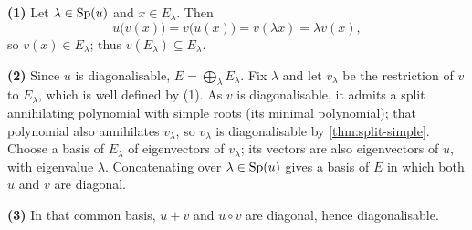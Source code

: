 \begin{solution}{}
\textbf{(1)} Let $\lambda\in\operatorname{Sp}(u)$ and $x\in E_\lambda$. Then
\[
  u\bigl(v(x)\bigr)=v\bigl(u(x)\bigr)=v(\lambda x)=\lambda v(x),
\]
so $v(x)\in E_\lambda$; thus $v(E_\lambda)\subseteq E_\lambda$.

\textbf{(2)} Since $u$ is diagonalisable, $E=\bigoplus_{\lambda}E_\lambda$. Fix
$\lambda$ and let $v_\lambda$ be the restriction of $v$ to $E_\lambda$, which is
well defined by (1). As $v$ is diagonalisable, it admits a split annihilating
polynomial with simple roots (its minimal polynomial); that polynomial also
annihilates $v_\lambda$, so $v_\lambda$ is diagonalisable by
\cref{thm:split-simple}. Choose a basis of $E_\lambda$ of eigenvectors of
$v_\lambda$; its vectors are also eigenvectors of $u$, with eigenvalue
$\lambda$. Concatenating over $\lambda\in\operatorname{Sp}(u)$ gives a basis of $E$ in which
both $u$ and $v$ are diagonal.

\textbf{(3)} In that common basis, $u+v$ and $u\circ v$ are diagonal, hence
diagonalisable.
\end{solution}
